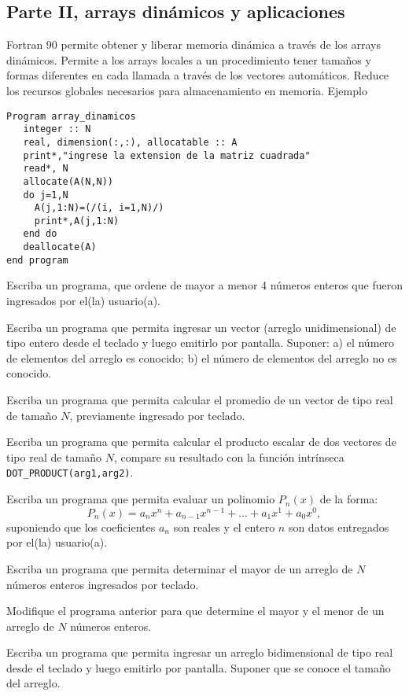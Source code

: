\documentclass[11pt]{exam}
\begin{document}
\begin{questions}
\noindent
\section{Parte II, arrays din\'amicos y aplicaciones}
Fortran 90 permite obtener y liberar memoria din\'amica a trav\'es de los arrays din\'amicos. Permite a los arrays locales a un procedimiento tener tama\~nos y formas diferentes en cada llamada a trav\'es de los vectores autom\'aticos. Reduce los recursos globales necesarios para almacenamiento en memoria.
Ejemplo\\
\begin{verbatim}
Program array_dinamicos
   integer :: N
   real, dimension(:,:), allocatable :: A
   print*,"ingrese la extension de la matriz cuadrada"
   read*, N
   allocate(A(N,N))
   do j=1,N
     A(j,1:N)=(/(i, i=1,N)/)
     print*,A(j,1:N)
   end do
   deallocate(A)
end program 
\end{verbatim}
\item 
Escriba un programa, que ordene de mayor a menor 4 n\'umeros enteros que fueron ingresados por el(la) usuario(a).
\item 
Escriba un programa que permita ingresar un vector (arreglo unidimensional) de tipo entero desde el teclado y luego emitirlo por pantalla. Suponer: a) el n\'umero de elementos del arreglo es conocido; b) el n\'umero de elementos del arreglo no es conocido.  
\item 
Escriba un programa que permita calcular el promedio de un vector de tipo real de tama\~no $N$, previamente ingresado por teclado. 
\item 
Escriba un programa que permita calcular el producto escalar de dos vectores de tipo real de tama\~no $N$, compare su resultado con la funci\'on intr\'inseca  \texttt{DOT\_PRODUCT(arg1,arg2)}.
\item     
Escriba un programa que permita evaluar un polinomio $P_{n}(x)$ de la forma:
\begin{equation}
P_{n}(x)=a_{n}x^{n}+a_{n-1}x^{n-1}+\ldots+a_{1}x^{1}+a_{0}x^{0},
\end{equation}
suponiendo que los coeficientes $a_{n}$ son reales y  el entero $n$ son datos entregados por el(la) usuario(a).
\item 
Escriba un programa  que permita determinar el mayor de un arreglo de $N$ n\'umeros enteros ingresados por teclado.
\item 
Modifique el programa anterior para que determine el mayor y el menor de un arreglo de $N$ n\'umeros enteros.
\item 
Escriba un programa  que permita ingresar un arreglo bidimensional de tipo real desde el teclado y luego emitirlo por pantalla. Suponer que se conoce el tama\~no del arreglo.


\end{questions}
\end{document}
